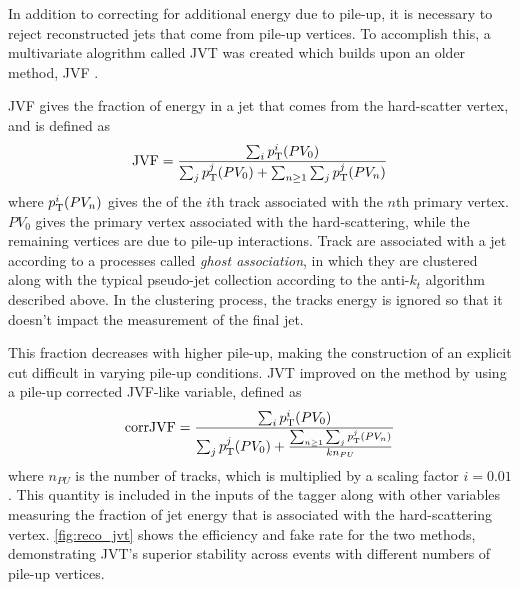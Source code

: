 In addition to correcting for additional energy due to pile-up, it is necessary to reject reconstructed jets that come from pile-up vertices. To accomplish this, a multivariate alogrithm called \ac{JVT} was created which builds upon an older method, \ac{JVF} \cite{ATLAS-CONF-2014-018}. 

\ac{JVF} gives the fraction of energy in a jet that comes from the hard-scatter vertex, and is defined as 
%
\begin{equation}
\mathrm{JVF} = \frac{\sum_i p_{\text{T}}^i(PV_0)}{\sum_j p_{\text{T}}^j(PV_0) + \sum_{n\geq1} \sum_j p_{\text{T}}^j(PV_n)} 
\end{equation}
%
where $p_{\text{T}}^i(PV_n)$ gives the \pt of the $i$th track associated with the $n$th primary vertex. $PV_0$ gives the primary vertex associated with the hard-scattering, while the remaining vertices are due to pile-up interactions. Track are associated with a jet according to a processes called \textit{ghost association}, in which they are clustered along with the typical pseudo-jet collection according to the anti-$k_t$ algorithm described above. In the clustering process, the tracks energy is ignored so that it doesn't impact the measurement of the final jet. 

This fraction decreases with higher pile-up, making the construction of an explicit cut difficult in varying pile-up conditions. \ac{JVT} improved on the method by using a pile-up corrected \ac{JVF}-like variable, defined as 
%
\begin{equation}
\mathrm{corrJVF} = \frac{\sum_i p_{\text{T}}^i(PV_0)}{\sum_j p_{\text{T}}^j(PV_0) + \frac{\sum_{n\geq1} \sum_j p_{\text{T}}^j(PV_n)}{kn_{PU}}} 
\end{equation}
%
where $n_{PU}$ is the number of tracks, which is multiplied by a scaling factor $i = 0.01$. This quantity is included in the inputs of the tagger along with other variables measuring the fraction of jet energy that is associated with the hard-scattering vertex. \autoref{fig:reco_jvt} shows the efficiency and fake rate for the two methods, demonstrating \ac{JVT}'s superior stability across events with different numbers of pile-up vertices. 

